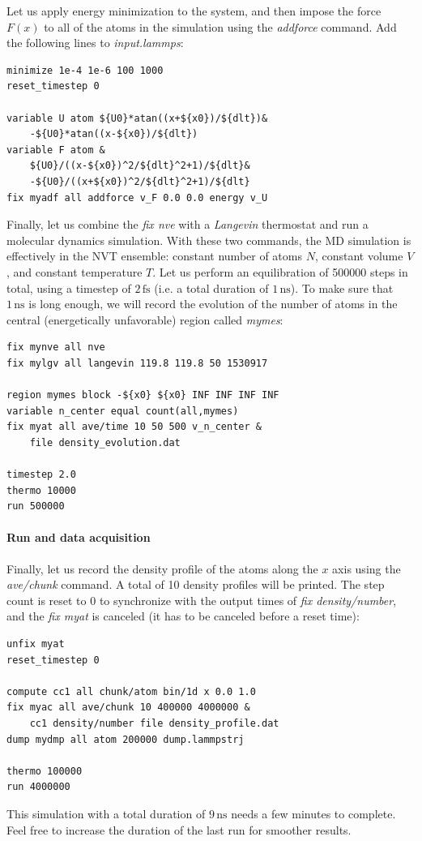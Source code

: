 \documentclass[9pt,tutorial]{livecoms}
\begin{document}
Let us apply energy minimization to the system, and then impose the force $F(x)$ to all of the atoms in the simulation using the \textit{addforce} command. Add the following lines to \textit{input.lammps}:
{\normalsize \begin{verbatim}
minimize 1e-4 1e-6 100 1000
reset_timestep 0

variable U atom ${U0}*atan((x+${x0})/${dlt})&
    -${U0}*atan((x-${x0})/${dlt})
variable F atom &
    ${U0}/((x-${x0})^2/${dlt}^2+1)/${dlt}&
    -${U0}/((x+${x0})^2/${dlt}^2+1)/${dlt}
fix myadf all addforce v_F 0.0 0.0 energy v_U
\end{verbatim}}
Finally, let us combine the \textit{fix nve} with a \textit{Langevin} thermostat and run a molecular dynamics simulation. With these two commands, the MD simulation is effectively in the NVT ensemble: constant number of atoms $N$, constant volume $V$, and constant temperature $T$. Let us perform an equilibration of 500000 steps in total, using a timestep of $2\,\text{fs}$ (i.e. a total duration of $1\,\text{ns}$). To make sure that $1\,\text{ns}$ is long enough, we will record the evolution of the number of atoms in the central (energetically unfavorable) region called \textit{mymes}:
{\normalsize \begin{verbatim}
fix mynve all nve
fix mylgv all langevin 119.8 119.8 50 1530917

region mymes block -${x0} ${x0} INF INF INF INF
variable n_center equal count(all,mymes)
fix myat all ave/time 10 50 500 v_n_center &
    file density_evolution.dat

timestep 2.0
thermo 10000
run 500000
\end{verbatim}}

\paragraph{Run and data acquisition}
Finally, let us record the density profile of the atoms along the $x$ axis using the \textit{ave/chunk} command. A total of 10 density profiles will be printed. The step count is reset to 0 to synchronize with the output times of \textit{fix density/number}, and the \textit{fix myat} is canceled (it has to be canceled before a reset time):
{\normalsize \begin{verbatim}
unfix myat
reset_timestep 0

compute cc1 all chunk/atom bin/1d x 0.0 1.0
fix myac all ave/chunk 10 400000 4000000 &
    cc1 density/number file density_profile.dat
dump mydmp all atom 200000 dump.lammpstrj

thermo 100000
run 4000000
\end{verbatim}}
This simulation with a total duration of $9\,\text{ns}$ needs a few minutes to complete. Feel free to increase the duration of the last run for smoother results.
\end{document}
